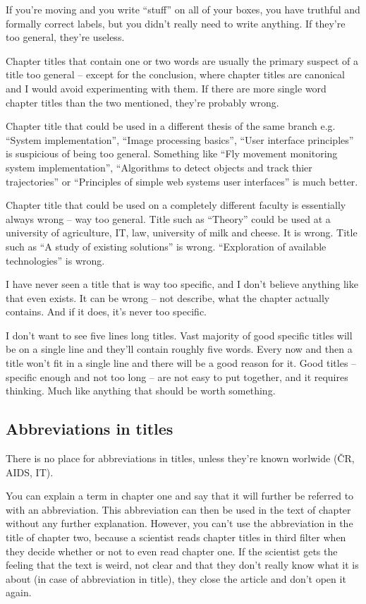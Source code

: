If you're moving and you write ``stuff'' on all of your boxes, you have truthful and formally correct labels, but you didn't really need to write anything. If they're too general, they're useless.

Chapter titles that contain one or two words are usually the primary suspect of a title too general -- except for the conclusion, where chapter titles are canonical and I would avoid experimenting with them. If there are more single word chapter titles than the two mentioned, they're probably wrong.

Chapter title that could be used in a different thesis of the same branch e.g. ``System implementation'', ``Image processing basics'', ``User interface principles'' is suspicious of being too general. Something like ``Fly movement monitoring system implementation'', ``Algorithms to detect objects and track thier trajectories'' or ``Principles of simple web systems user interfaces'' is much better.

Chapter title that could be used on a completely different faculty is essentially always wrong -- way too general. Title such as ``Theory'' could be used at a university of agriculture, IT, law, university of milk and cheese. It is wrong. Title such as ``A study of existing solutions'' is wrong. ``Exploration of available technologies'' is wrong.

I have never seen a title that is way too specific, and I don't believe anything like that even exists. It can be wrong -- not describe, what the chapter actually contains. And if it does, it's never too specific.

I don't want to see five lines long titles. Vast majority of good specific titles will be on a single line and they'll contain roughly five words. Every now and then a title won't fit in a single line and there will be a good reason for it. Good titles -- specific enough and not too long -- are not easy to put together, and it requires thinking. Much like anything that should be worth something.


\subsection*{Abbreviations in titles}

There is no place for abbreviations in titles, unless they're known worlwide (ČR, AIDS, IT).

You can explain a term in chapter one and say that it will further be referred to with an abbreviation. This abbreviation can then be used in the text of chapter without any further explanation. However, you can't use the abbreviation in the title of chapter two, because a scientist reads chapter titles in third filter when they decide whether or not to even read chapter one. If the scientist gets the feeling that the text is weird, not clear and that they don't really know what it is about (in case of abbreviation in title), they close the article and don't open it again.


